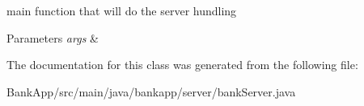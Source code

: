main function that will do the server hundling 


\begin{DoxyParams}{Parameters}
{\em args} & \\
\hline
\end{DoxyParams}


The documentation for this class was generated from the following file\+:\begin{DoxyCompactItemize}
\item 
Bank\+App/src/main/java/bankapp/server/bank\+Server.\+java\end{DoxyCompactItemize}
